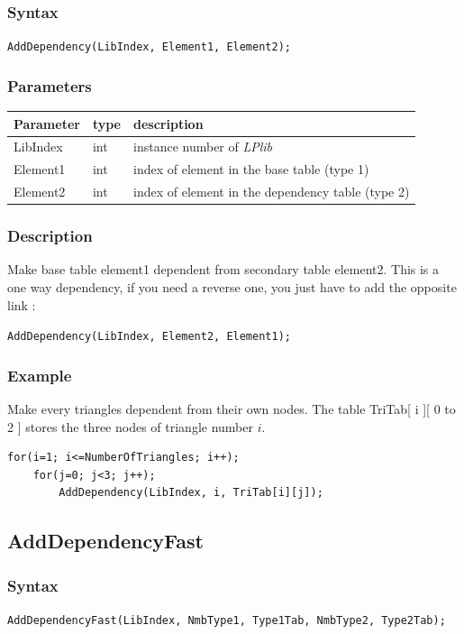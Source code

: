 \documentclass[a4paper,12pt]{article}
\begin{document}
\subsubsection*{Syntax}
\tt{AddDependency(LibIndex, Element1, Element2);}
\normalfont

\subsubsection*{Parameters}
\begin{tabular}{|m{2cm}|m{1.5cm}|m{10.5cm}|}
\hline
Parameter  & type   & description \\
\hline
LibIndex   & int    & instance number of \emph{LPlib} \\
\hline
Element1   & int    & index of element in the base table (type 1) \\
\hline
Element2   & int    & index of element in the dependency table (type 2) \\
\hline
\end{tabular}

\subsubsection*{Description}
Make base table element1 dependent from secondary table element2. This is a one way dependency, if you need a reverse one, you just have to add the opposite link :
\medskip

\tt{AddDependency(LibIndex, Element2, Element1);}
\normalfont

\subsubsection*{Example}
Make every triangles dependent from their own nodes. The table TriTab[ i ][ 0 to 2 ] stores the three nodes of triangle number $i$.

\begin{tt}
\begin{verbatim}
for(i=1; i<=NumberOfTriangles; i++);
    for(j=0; j<3; j++);
        AddDependency(LibIndex, i, TriTab[i][j]);
\end{verbatim}
\end{tt}
\normalfont


\subsection{AddDependencyFast}

\subsubsection*{Syntax}
\tt{AddDependencyFast(LibIndex, NmbType1, Type1Tab, NmbType2, Type2Tab);}
\normalfont
\end{document}
